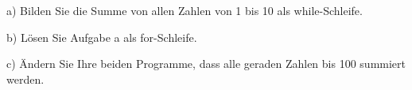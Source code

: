 a) Bilden Sie die Summe von allen Zahlen von 1 bis 10 als while-Schleife.

b) Lösen Sie Aufgabe a als for-Schleife.

c) Ändern Sie Ihre beiden Programme, dass alle geraden Zahlen bis 100 summiert werden.
